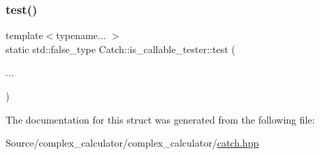 \mbox{\label{struct_catch_1_1is__callable__tester_adce16c4accb860bf46f6491dd70cfd63}} 
\subsubsection{\texorpdfstring{test()}{test()}\hspace{0.1cm}{\footnotesize\ttfamily [2/2]}}
{\footnotesize\ttfamily template$<$typename... $>$ \\
static std\+::false\+\_\+type Catch\+::is\+\_\+callable\+\_\+tester\+::test (\begin{DoxyParamCaption}\item[{}]{... }\end{DoxyParamCaption})\hspace{0.3cm}{\ttfamily [static]}}



The documentation for this struct was generated from the following file\+:\begin{DoxyCompactItemize}
\item 
Source/complex\+\_\+calculator/complex\+\_\+calculator/\mbox{\hyperlink{catch_8hpp}{catch.\+hpp}}\end{DoxyCompactItemize}
